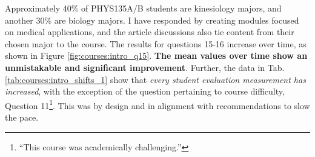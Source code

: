 \documentclass[../../main.tex]{subfiles}
\begin{document}
Approximately 40\% of PHYS135A/B students are kinesiology majors, and another 30\% are biology majors.  I have responded by creating modules focused on medical applications, and the article discussions also tie content from their chosen major to the course.  The results for questions 15-16 increase over time, as shown in Figure  \ref{fig:courses:intro_q15}.  \textbf{The mean values over time show an unmistakable and significant improvement}.  Further, the data in Tab. \ref{tab:courses:intro_shifts_1} show that \textit{every student evaluation measurement has increased}, with the exception of the question pertaining to course difficulty, Question 11\footnote{``This course was academically challenging.''}.  This was by design and in alignment with recommendations to slow the pace. \\ \hspace{0.1cm}
\end{document}
